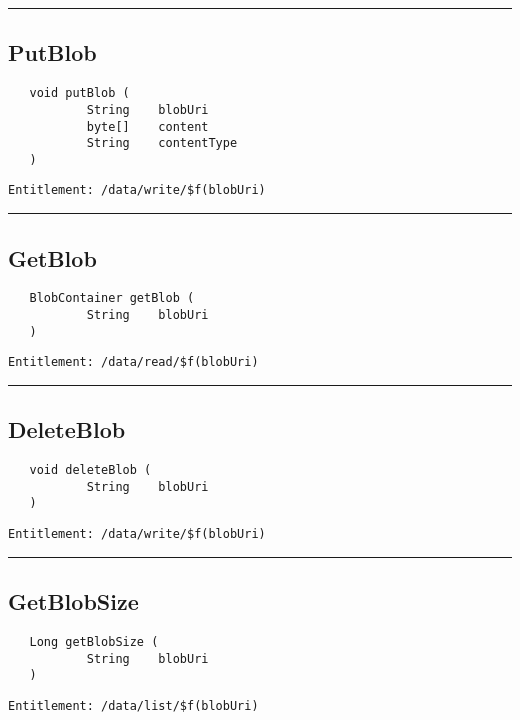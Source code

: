 \rule{12cm}{2pt}
\subsection{PutBlob}
\label{Api:PutBlob}
\begin{Verbatim}
   void putBlob (
           String    blobUri
           byte[]    content
           String    contentType
   )
\end{Verbatim}
\begin{Verbatim}[formatcom=\color{Maroon}]
  Entitlement: /data/write/$f(blobUri)
\end{Verbatim}



\rule{12cm}{2pt}
\subsection{GetBlob}
\label{Api:GetBlob}
\begin{Verbatim}
   BlobContainer getBlob (
           String    blobUri
   )
\end{Verbatim}
\begin{Verbatim}[formatcom=\color{Maroon}]
  Entitlement: /data/read/$f(blobUri)
\end{Verbatim}



\rule{12cm}{2pt}
\subsection{DeleteBlob}
\label{Api:DeleteBlob}
\begin{Verbatim}
   void deleteBlob (
           String    blobUri
   )
\end{Verbatim}
\begin{Verbatim}[formatcom=\color{Maroon}]
  Entitlement: /data/write/$f(blobUri)
\end{Verbatim}



\rule{12cm}{2pt}
\subsection{GetBlobSize}
\label{Api:GetBlobSize}
\begin{Verbatim}
   Long getBlobSize (
           String    blobUri
   )
\end{Verbatim}
\begin{Verbatim}[formatcom=\color{Maroon}]
  Entitlement: /data/list/$f(blobUri)
\end{Verbatim}



